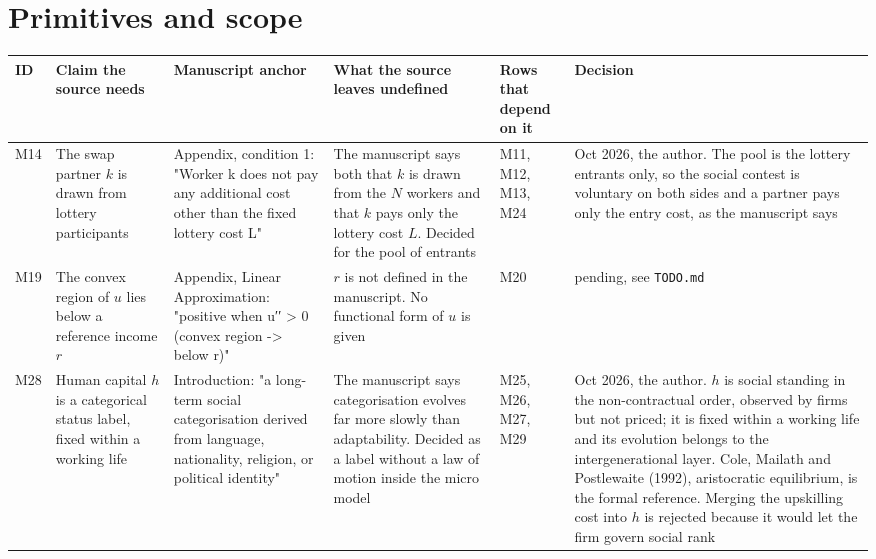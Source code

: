 \documentclass[10pt]{article}
\begin{document}
\section{Primitives and scope}
{\small
\begin{longtable}{>{\raggedright\arraybackslash}p{0.8cm} >{\raggedright\arraybackslash}p{4.6cm} >{\raggedright\arraybackslash}p{5.0cm} >{\raggedright\arraybackslash}p{6.6cm} >{\raggedright\arraybackslash}p{2.6cm} >{\raggedright\arraybackslash}p{2.8cm}}
\toprule ID & Claim the source needs & Manuscript anchor & What the source leaves undefined & Rows that depend on it & Decision \\ \midrule \endhead
M14 & The swap partner $k$ is drawn from lottery participants & Appendix, condition 1: "Worker k does not pay any additional cost other than the fixed lottery cost L" & The manuscript says both that $k$ is drawn from the $N$ workers and that $k$ pays only the lottery cost $L$. Decided for the pool of entrants & M11, M12, M13, M24 & 10 Oct 2026, the author. The pool is the lottery entrants only, so the social contest is voluntary on both sides and a partner pays only the entry cost, as the manuscript says \\ \midrule
M19 & The convex region of $u$ lies below a reference income $r$ & Appendix, Linear Approximation: "positive when u′′ \textgreater{} 0 (convex region -\textgreater{} below r)" & $r$ is not defined in the manuscript. No functional form of $u$ is given & M20 & pending, see \nolinkurl{TODO.md} \\ \midrule
M28 & Human capital $h$ is a categorical status label, fixed within a working life & Introduction: "a long-term social categorisation derived from language, nationality, religion, or political identity" & The manuscript says categorisation evolves far more slowly than adaptability. Decided as a label without a law of motion inside the micro model & M25, M26, M27, M29 & 11 Oct 2026, the author. $h$ is social standing in the non-contractual order, observed by firms but not priced; it is fixed within a working life and its evolution belongs to the intergenerational layer. Cole, Mailath and Postlewaite (1992), aristocratic equilibrium, is the formal reference. Merging the upskilling cost into $h$ is rejected because it would let the firm govern social rank \\ \midrule

\end{longtable}}
\end{document}
